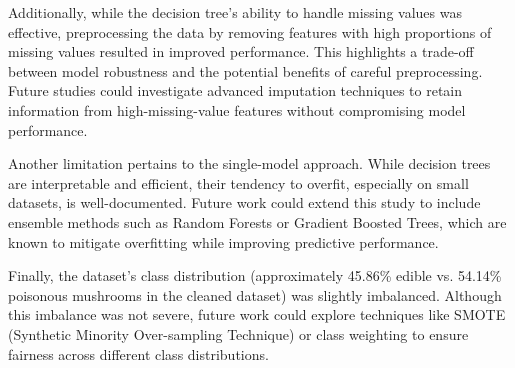 \documentclass{article}
\begin{document}
Additionally, while the decision tree's ability to handle missing values was effective, preprocessing the data by removing features with high proportions of missing values resulted in improved performance. This highlights a trade-off between model robustness and the potential benefits of careful preprocessing. Future studies could investigate advanced imputation techniques to retain information from high-missing-value features without compromising model performance.

Another limitation pertains to the single-model approach. While decision trees are interpretable and efficient, their tendency to overfit, especially on small datasets, is well-documented. Future work could extend this study to include ensemble methods such as Random Forests or Gradient Boosted Trees, which are known to mitigate overfitting while improving predictive performance.

Finally, the dataset's class distribution (approximately 45.86\% edible vs. 54.14\% poisonous mushrooms in the cleaned dataset) was slightly imbalanced. Although this imbalance was not severe, future work could explore techniques like SMOTE (Synthetic Minority Over-sampling Technique) or class weighting to ensure fairness across different class distributions.
  
\end{document}
